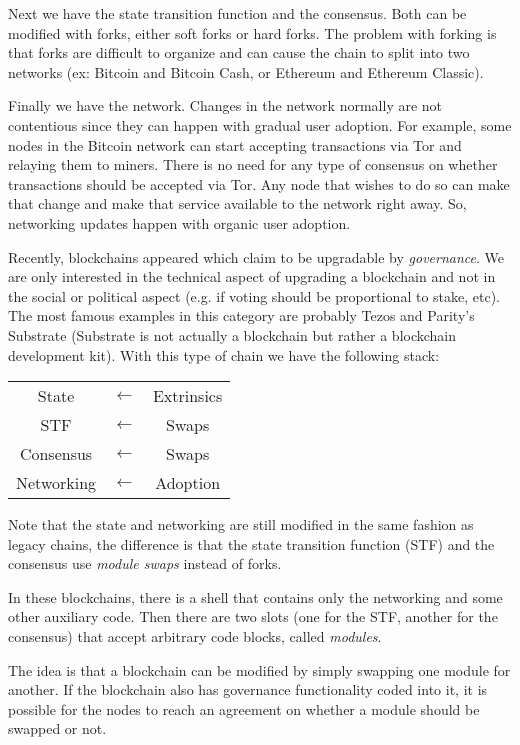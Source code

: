 \documentclass[conference]{IEEEtran}
\begin{document}
Next we have the state transition function and the consensus. Both can be modified with forks, either soft forks or hard forks. The problem with forking is that forks are difficult to organize and can cause the chain to split into two networks (ex: Bitcoin and Bitcoin Cash, or Ethereum and Ethereum Classic).

Finally we have the network. Changes in the network normally are not contentious since they can happen with gradual user adoption. For example, some nodes in the Bitcoin network can start accepting transactions via Tor and relaying them to miners. There is no need for any type of consensus on whether transactions should be accepted via Tor. Any node that wishes to do so can make that change and make that service available to the network right away. So, networking updates happen with organic user adoption.

Recently, blockchains appeared which claim to be upgradable by \textit{governance}. We are only interested in the technical aspect of upgrading a blockchain and not in the social or political aspect (e.g. if voting should be proportional to stake, etc). The most famous examples in this category are probably Tezos \cite{goodman2014tezos} and Parity's Substrate (Substrate is not actually a blockchain but rather a blockchain development kit). With this type of chain we have the following stack:

\begin{center}
	\begin{tabular}{c c c}
		State & $\leftarrow$ & Extrinsics\\
		\cline{1-1}
		STF & $\leftarrow$ & Swaps\\
		\cline{1-1}
		Consensus & $\leftarrow$ & Swaps\\
		\cline{1-1}
		Networking & $\leftarrow$ & Adoption
	\end{tabular}
\end{center}

Note that the state and networking are still modified in the same fashion as legacy chains, the difference is that the state transition function (STF) and the consensus use \textit{module swaps} instead of forks.

In these blockchains, there is a shell that contains only the networking and some other auxiliary code. Then there are two slots (one for the STF, another for the consensus) that accept arbitrary code blocks, called \textit{modules}.

The idea is that a blockchain can be modified by simply swapping one module for another. If the blockchain also has governance functionality coded into it, it is possible for the nodes to reach an agreement on whether a module should be swapped or not.
\end{document}
